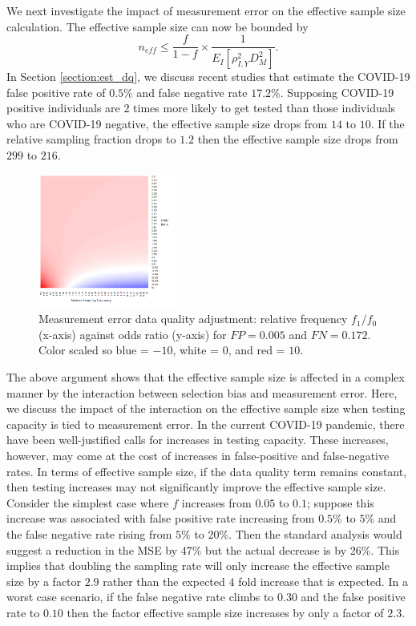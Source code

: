 \documentclass[aoas]{amsart}
\begin{document}
We next investigate the impact of measurement error on the effective sample size calculation.  The effective sample size can now be bounded by
$$
n_{eff} \le \frac{f}{1-f} \times \frac{1}{E_{I} \left[ \rho_{I,Y}^2 D_M^2 \right]}.
$$
In Section \ref{section:est_dq}, we discuss recent studies that estimate the COVID-19 false positive rate of $0.5$\% and false negative rate $17.2$\%.  Supposing COVID-19 positive individuals are $2$ times more likely to get tested than those individuals who are COVID-19 negative, the effective sample size drops from $14$ to $10$. If the relative sampling fraction drops to $1.2$ then the effective sample size drops from $299$ to $216$.

\begin{figure}
\centering
\includegraphics[width = 0.4\textwidth]{../methods/figs/mem_heatmap_article.png}
\caption{Measurement error data quality adjustment: relative frequency $f_1/f_0$ (x-axis) against odds ratio (y-axis) for $FP=0.005$ and $FN=0.172$. Color scaled so blue = $-10$, white = $0$, and red = $10$.}
\label{fig:heatmap}
\vspace{-0.3cm}
\end{figure}


The above argument shows that the effective sample size is affected in a complex manner by the interaction between selection bias and measurement error.  Here, we discuss the impact of the interaction on the effective sample size when testing capacity is tied to measurement error.  In the current COVID-19 pandemic, there have been well-justified calls for increases in testing capacity.  These increases, however, may come at the cost of increases in false-positive and false-negative rates.  In terms of effective sample size, if the data quality term remains constant, then testing increases may not significantly improve the effective sample size.  Consider the simplest case where $f$ increases from $0.05$ to $0.1$; suppose this increase was associated with  false positive rate increasing from $0.5$\% to $5$\% and the false negative rate rising from $5\%$ to $20$\%.  Then the standard analysis would suggest a reduction in the MSE by 47\% but the actual decrease is by 26\%.  This implies that doubling the sampling rate will only increase the effective sample size by a factor $2.9$ rather than the expected $4$ fold increase that is expected.  In a worst case scenario, if the false negative rate climbs to $0.30$ and the false positive rate to $0.10$ then the factor effective sample size increases by only a factor of $2.3$.
\end{document}
